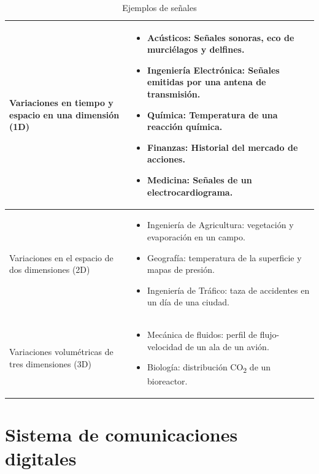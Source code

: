 \begin{table}[ht]
\begin{center}
	\begin{tabular}{|p{6cm}|p{7.3cm}|}
		\hline
		Variaciones en tiempo y espacio en una dimensi\'on (1D) &
		\begin{itemize}
		  \item Ac\'usticos: Se\~nales sonoras, eco de murci\'elagos y delfines.
		  \item Ingenier\'ia Electr\'onica: Se\~nales emitidas por una antena de
		  transmisi\'on.
		  \item Qu\'imica: Temperatura de una reacci\'on qu\'imica.
		  \item Finanzas: Historial del mercado de acciones.
		  \item Medicina: Se\~nales de un electrocardiograma.
		\end{itemize} \\
		\hline
		Variaciones en el espacio de dos dimensiones (2D) &
		\begin{itemize}
		  \item Ingenier\'ia de Agricultura: vegetaci\'on y evaporaci\'on en un campo.
		  \item Geograf\'ia: temperatura de la superficie y mapas de presi\'on.
		  \item Ingenier\'ia de Tr\'afico: taza de accidentes en un d\'ia de una
		  ciudad.
		\end{itemize} \\
		\hline
		Variaciones volum\'etricas de tres dimensiones (3D) &
		\begin{itemize}
		  \item Mec\'anica de fluidos: perfil de flujo-velocidad de un ala de un
		  avi\'on.
		  \item Biolog\'ia: distribuci\'on CO\textsubscript{2} de un bioreactor.
		\end{itemize} \\
		\hline
	\end{tabular}
	\vspace{0.5in}
	\caption{Ejemplos de se\~nales}
	\label{tbl:signals}
\end{center}
\end{table}

\newpage
\section{Sistema de comunicaciones digitales}

